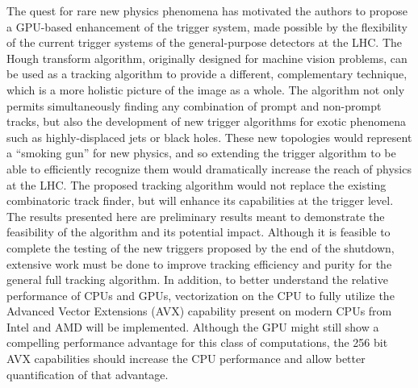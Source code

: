 \documentclass{JINST}
\begin{document}
The quest for rare new physics phenomena has motivated the authors to propose a GPU-based enhancement of the trigger
system, made possible by the flexibility of the current trigger systems of the general-purpose detectors at the LHC. The
Hough transform algorithm, originally designed for machine vision problems, can be used as a tracking algorithm to
provide a different, complementary technique, which is a more holistic picture of the image as a whole. The algorithm
not only permits simultaneously finding any combination of prompt and non-prompt tracks, but also the development of new trigger
algorithms for exotic phenomena such as highly-displaced jets or black holes. These new topologies would represent a
``smoking gun'' for new physics, and so extending the trigger algorithm to be able to efficiently recognize them would
dramatically increase the reach of physics at the LHC. The proposed tracking algorithm would not replace the existing
combinatoric track finder, but will enhance its capabilities at the trigger level. The results presented here are
preliminary results meant to demonstrate the feasibility of the algorithm and its potential impact. Although it is
feasible to complete the testing of the new triggers proposed by the end of the shutdown, extensive work must be done to
improve tracking efficiency and purity for the general full tracking algorithm. In addition,
to better understand the relative performance of CPUs and GPUs, vectorization on the CPU to fully
utilize the Advanced Vector Extensions (AVX) capability present on modern CPUs from Intel and AMD will be implemented.  Although the GPU
might still show a compelling performance advantage for this class of computations, the 256 bit AVX capabilities should
increase the CPU performance and allow better quantification of that advantage.


\end{document}
